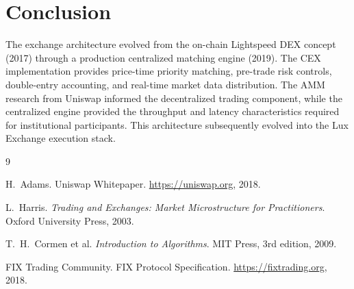 \documentclass[11pt,a4paper]{article}
\begin{document}
\section{Conclusion}

The exchange architecture evolved from the on-chain Lightspeed DEX concept (2017) through a production centralized matching engine (2019). The CEX implementation provides price-time priority matching, pre-trade risk controls, double-entry accounting, and real-time market data distribution. The AMM research from Uniswap informed the decentralized trading component, while the centralized engine provided the throughput and latency characteristics required for institutional participants. This architecture subsequently evolved into the Lux Exchange execution stack.


\begin{thebibliography}{9}

H.~Adams. Uniswap Whitepaper. \url{https://uniswap.org}, 2018.

L.~Harris. \textit{Trading and Exchanges: Market Microstructure for Practitioners}. Oxford University Press, 2003.

T.~H.~Cormen et al. \textit{Introduction to Algorithms}. MIT Press, 3rd edition, 2009.

FIX Trading Community. FIX Protocol Specification. \url{https://fixtrading.org}, 2018.

\end{thebibliography}
\end{document}
